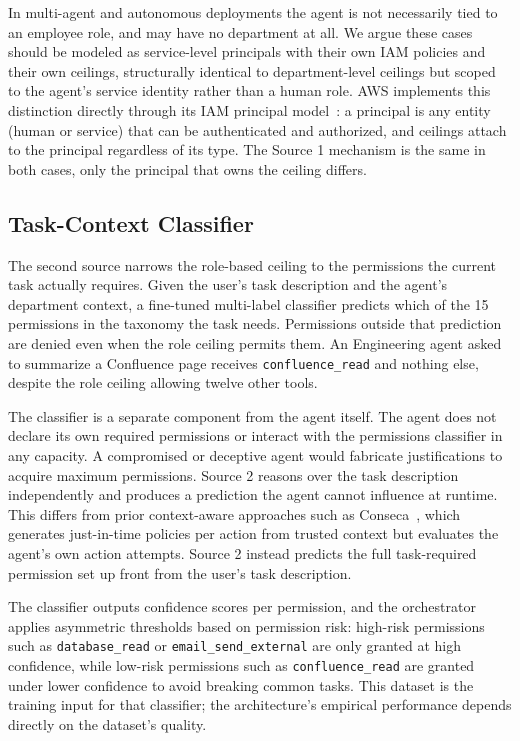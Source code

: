 \documentclass{article}
\theoremstyle{plain}
\theoremstyle{definition}
\theoremstyle{remark}
\begin{document}
In multi-agent and autonomous deployments the agent is not necessarily 
tied to an employee role, and may have no department at all. We argue 
these cases should be modeled as service-level principals with their own 
IAM policies and their own ceilings, structurally identical to 
department-level ceilings but scoped to the agent's service identity 
rather than a human role. AWS implements this distinction directly through 
its IAM principal model~\citep{aws-iam-principals}: a principal is any 
entity (human or service) that can be authenticated and authorized, and 
ceilings attach to the principal regardless of its type. The Source 1 
mechanism is the same in both cases, only the principal that owns the 
ceiling differs.

\subsection{Task-Context Classifier}

The second source narrows the role-based ceiling to the permissions the 
current task actually requires. Given the user's task description and the 
agent's department context, a fine-tuned multi-label classifier predicts 
which of the 15 permissions in the taxonomy the task needs. Permissions 
outside that prediction are denied even when the role ceiling permits them. 
An Engineering agent asked to summarize a Confluence page receives 
\texttt{confluence\_read} and nothing else, despite the role ceiling 
allowing twelve other tools.

The classifier is a separate component from the agent itself. The agent 
does not declare its own required permissions or interact with the 
permissions classifier in any capacity. A compromised or deceptive agent 
would fabricate justifications to acquire maximum permissions. Source 2 
reasons over the task description independently and produces a prediction 
the agent cannot influence at runtime. This differs from prior context-aware approaches such as Conseca~\citep{tsai2025conseca}, which generates just-in-time policies per action from trusted context but evaluates the agent's own action attempts. Source 2 instead predicts the full task-required permission set up front from the user's task description.

The classifier outputs confidence 
scores per permission, and the orchestrator applies asymmetric thresholds 
based on permission risk: high-risk permissions such 
as \texttt{database\_read} or \texttt{email\_send\_external} are only granted 
at high confidence, while low-risk permissions such 
as \texttt{confluence\_read} are granted under lower confidence to avoid 
breaking common tasks. This dataset is the training input for that 
classifier; the architecture's empirical performance depends directly on 
the dataset's quality.
\end{document}

